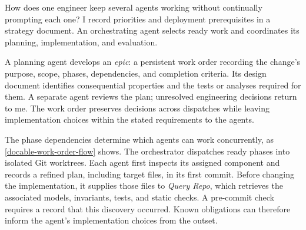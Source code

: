 

How does one engineer keep several agents working without continually prompting each one? I record priorities and deployment prerequisites in a strategy document. An orchestrating agent selects ready work and coordinates its planning, implementation, and evaluation.

A planning agent develops an \emph{epic}: a persistent work order recording the change's purpose, scope, phases, dependencies, and completion criteria. Its design document identifies consequential properties and the tests or analyses required for them. A separate agent reviews the plan; unresolved engineering decisions return to me. The work order preserves decisions across dispatches while leaving implementation choices within the stated requirements to the agents.


The phase dependencies determine which agents can work concurrently, as \autoref{docable-work-order-flow} shows. The orchestrator dispatches ready phases into isolated Git worktrees. Each agent first inspects its assigned component and records a refined plan, including target files, in its first commit. Before changing the implementation, it supplies those files to \emph{Query Repo}, which retrieves the associated models, invariants, tests, and static checks. A pre-commit check requires a record that this discovery occurred. Known obligations can therefore inform the agent's implementation choices from the outset.

